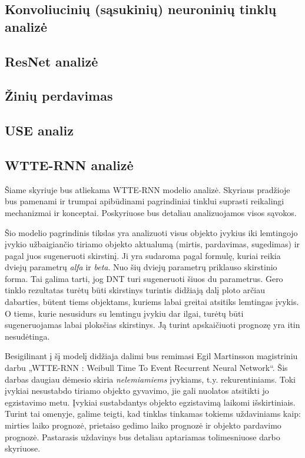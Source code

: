 \documentclass{VUMIFPSkursinis}
\begin{document}
\subsection{Konvoliucinių (sąsukinių) neuroninių tinklų analizė}

\subsection{ResNet analizė}

\subsection{Žinių perdavimas}

\subsection{USE analiz}


\subsection{WTTE-RNN analizė}

Šiame skyriuje bus atliekama WTTE-RNN modelio analizė. Skyriaus pradžioje bus pamenami ir trumpai apibūdinami pagrindiniai tinklui suprasti reikalingi mechanizmai ir konceptai. Poskyriuose bus detaliau analizuojamos visos sąvokos. 

Šio modelio pagrindinis tikslas yra analizuoti visus objekto įvykius iki lemtingojo įvykio užbaigiančio tiriamo objekto aktualumą (mirtis, pardavimas, sugedimas) ir pagal juos sugeneruoti skirstinį. Ji yra sudaroma pagal formulę, kuriai reikia dviejų parametrų \textit{alfa} ir \textit{beta}. Nuo šių dviejų parametrų priklauso skirstinio forma. Tai galima tarti, jog DNT turi sugeneruoti šiuos du parametrus. Gero tinklo rezultatas turėtų būti skirstinys turintis didžiają dalį ploto arčiau dabarties, būtent tiems objektams, kuriems labai greitai atsitiks lemtingas įvykis. O tiems, kurie nesusidurs su lemtingu įvykiu dar ilgai, turėtų būti sugeneruojamas labai ploksčias skirstinys. Ją turint apskaičiuoti prognozę yra itin nesudėtinga.

Besigilinant į šį modelį didžiaja dalimi bus remimasi Egil Martinsson magistriniu darbu „WTTE-RNN : Weibull Time To Event Recurrent Neural Network“. Šis darbas daugiau dėmesio skiria \textit{nelemiamiems} įvykiams, t.y. rekurentiniams. Toki įvykiai nesustabdo tiriamo objekto gyvavimo, jie gali nuolatos atsitikti jo egzistavimo metu. Įvykiai sustabdantys objekto egzistavimą laikomi išskirtiniais. Turint tai omenyje, galime teigti, kad tinklas tinkamas tokiems uždaviniams kaip: mirties laiko prognozė, prietaiso gedimo laiko prognozė ir objekto pardavimo prognozė. Pastarasis uždavinys bus detaliau aptariamas tolimesniuose darbo skyriuose.
\end{document}
